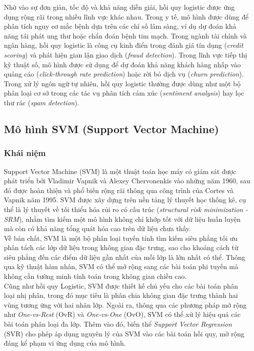Nhờ vào sự đơn giản, tốc độ và khả năng diễn giải, hồi quy logistic được ứng dụng rộng rãi trong nhiều lĩnh vực khác nhau. Trong y tế, mô hình được dùng để phân tích nguy cơ mắc bệnh dựa trên các chỉ số lâm sàng, ví dụ dự đoán khả năng tái phát ung thư hoặc chẩn đoán bệnh tim mạch. Trong ngành tài chính và ngân hàng, hồi quy logistic là công cụ kinh điển trong đánh giá tín dụng (\textit{credit scoring}) và phát hiện gian lận giao dịch (\textit{fraud detection}). Trong lĩnh vực tiếp thị kỹ thuật số, mô hình được sử dụng để dự đoán khả năng khách hàng nhấp vào quảng cáo (\textit{click-through rate prediction}) hoặc rời bỏ dịch vụ (\textit{churn prediction}). Trong xử lý ngôn ngữ tự nhiên, hồi quy logistic thường được dùng như một bộ phân loại cơ sở trong các tác vụ phân tích cảm xúc (\textit{sentiment analysis}) hay lọc thư rác (\textit{spam detection}). \\

\subsection{Mô hình SVM (Support Vector Machine)}
\subsubsection{Khái niệm}

Support Vector Machine (SVM) là một thuật toán học máy có giám sát được phát triển bởi Vladimir Vapnik và Alexey Chervonenkis vào những năm 1960, sau đó được hoàn thiện và phổ biến rộng rãi thông qua công trình của Cortes và Vapnik năm 1995. SVM được xây dựng trên nền tảng lý thuyết học thống kê, cụ thể là lý thuyết về tối thiểu hóa rủi ro có cấu trúc (\textit{structural risk minimization - SRM}), nhằm tìm kiếm một mô hình không chỉ khớp tốt với dữ liệu huấn luyện mà còn có khả năng tổng quát hóa cao trên dữ liệu chưa thấy.\\

Về bản chất, SVM là một bộ phân loại tuyến tính tìm kiếm siêu phẳng tối ưu phân tách các lớp dữ liệu trong không gian đặc trưng, sao cho khoảng cách từ siêu phẳng đến các điểm dữ liệu gần nhất của mỗi lớp là lớn nhất có thể. Thông qua kỹ thuật hàm nhân, SVM có thể mở rộng sang các bài toán phi tuyến mà không cần tường minh tính toán trong không gian chiều cao.\\

Cũng như hồi quy Logistic, SVM được thiết kế chủ yếu cho các bài toán phân loại nhị phân, trong đó mục tiêu là phân chia không gian đặc trưng thành hai vùng tương ứng với hai nhãn lớp. Ngoài ra, thông qua các phương pháp mở rộng như \textit{One-vs-Rest} (OvR) và \textit{One-vs-One} (OvO), SVM có thể xử lý hiệu quả các bài toán phân loại đa lớp. Thêm vào đó, biến thể \textit{Support Vector Regression} (SVR) cho phép áp dụng nguyên lý của SVM vào các bài toán hồi quy, mở rộng đáng kể phạm vi ứng dụng của mô hình.\\

